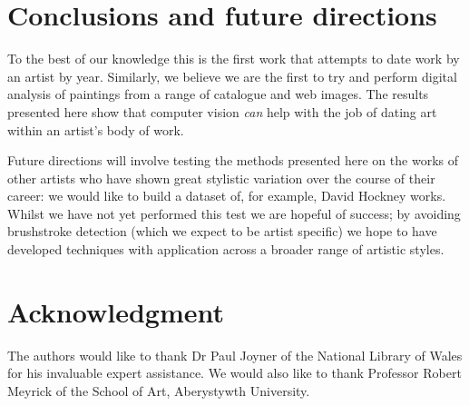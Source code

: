 \documentclass[conference,a4paper]{IEEEtran}
\begin{document}
\section{Conclusions and future directions}

To the best of our knowledge this is the first work that attempts to date work
by an artist by year. Similarly, we believe we are the first to try and perform
digital analysis of paintings from a range of catalogue and web images. The
results presented here show that computer vision \emph{can} help with the job
of dating art within an artist's body of work. 

Future directions will involve testing the methods presented here on the works
of other artists who have shown great stylistic variation over the course of
their career: we would like to build a dataset of, for example, David Hockney
works.  Whilst we have not yet performed this test we are hopeful of success;
by avoiding brushstroke detection (which we expect to be artist specific) we
hope to have developed techniques with application across a broader range of
artistic styles. 





\section*{Acknowledgment}


The authors would like to thank Dr Paul Joyner of the National Library of Wales
for his invaluable expert assistance. We would also like to thank Professor
Robert Meyrick of the School of Art, Aberystywth University.










\end{document}
